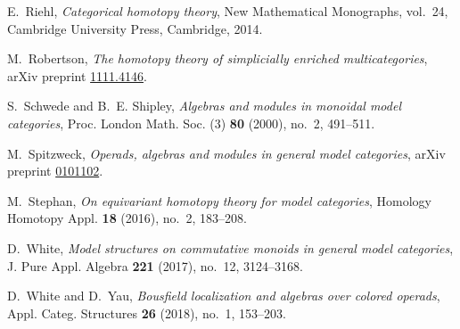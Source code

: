 \documentclass[a4paper,10pt
]{article}%
\numberwithin{equation}{section}
\numberwithin{figure}{section}
\theoremstyle{definition} %
\newcommand{\1}{\ensuremath{\mathbbm 1}}%
\begin{document}
\begin{thebibliography}{HHR16}
E.~Riehl, \emph{Categorical homotopy theory}, New Mathematical Monographs,
  vol.~24, Cambridge University Press, Cambridge, 2014.

M.~Robertson, \emph{The homotopy theory of simplicially enriched
  multicategories}, arXiv preprint
  \href{https://arxiv.org/abs/1111.4146}{1111.4146}.

S.~Schwede and B.~E. Shipley, \emph{Algebras and modules in monoidal model
  categories}, Proc. London Math. Soc. (3) \textbf{80} (2000), no.~2, 491--511.

M.~Spitzweck, \emph{Operads, algebras and modules in general model categories},
  arXiv preprint \href{https://arxiv.org/abs/math/0101102}{0101102}.

M.~Stephan, \emph{On equivariant homotopy theory for model categories},
  Homology Homotopy Appl. \textbf{18} (2016), no.~2, 183--208.

D.~White, \emph{Model structures on commutative monoids in general model
  categories}, J. Pure Appl. Algebra \textbf{221} (2017), no.~12, 3124--3168.

D.~White and D.~Yau, \emph{Bousfield localization and algebras over colored
  operads}, Appl. Categ. Structures \textbf{26} (2018), no.~1, 153--203.

\end{thebibliography}



\makeatletter{}\makeatother
\end{document}
